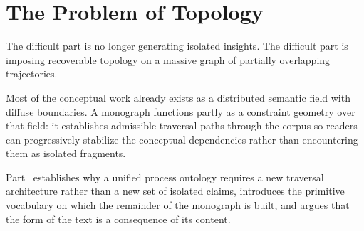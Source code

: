 \part{The Problem of Topology}
\label{part:topology}

\epigraph{The difficult part is no longer generating isolated insights. The difficult part
is imposing recoverable topology on a massive graph of partially overlapping trajectories.}{}

\vspace{1cm}
\noindent Most of the conceptual work already exists as a distributed semantic field with
diffuse boundaries. A monograph functions partly as a constraint geometry over that field:
it establishes admissible traversal paths through the corpus so readers can progressively
stabilize the conceptual dependencies rather than encountering them as isolated fragments.

Part~\ref{part:topology} establishes why a unified process ontology requires a new traversal
architecture rather than a new set of isolated claims, introduces the primitive vocabulary on
which the remainder of the monograph is built, and argues that the form of the text is a
consequence of its content.
\cleardoublepage
